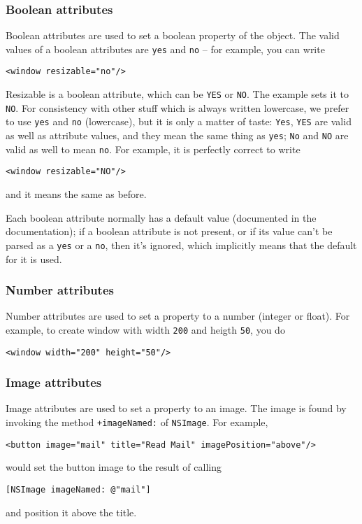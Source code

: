 \subsubsection{Boolean attributes}
Boolean attributes are used to set a boolean property of the object.
The valid values of a boolean attributes are \texttt{yes} and
\texttt{no} -- for example, you can write
\begin{verbatim}
<window resizable="no"/>
\end{verbatim}
Resizable is a boolean attribute, which can be \texttt{YES} or
\texttt{NO}.  The example sets it to \texttt{NO}.  For consistency 
with other stuff which is always written lowercase, we prefer to use
\texttt{yes} and \texttt{no} (lowercase), but it is only a matter of taste: 
\texttt{Yes}, \texttt{YES} are valid as well as attribute values, and they
mean the same thing as \texttt{yes}; \texttt{No} and \texttt{NO} are
valid as well to mean \texttt{no}.  For example, it is perfectly
correct to write
\begin{verbatim}
<window resizable="NO"/>
\end{verbatim}
and it means the same as before.

Each boolean attribute normally has a default value (documented in the
documentation); if a boolean attribute is not present, or if its value
can't be parsed as a \texttt{yes} or a \texttt{no}, then it's ignored,
which implicitly means that the default for it is used.

\subsubsection{Number attributes}
Number attributes are used to set a property to a number (integer or
float).  For example, to create window with width \texttt{200} and 
heigth \texttt{50}, you do
\begin{verbatim}
<window width="200" height="50"/>
\end{verbatim}

\subsubsection{Image attributes}
Image attributes are used to set a property to an image.  The image is
found by invoking the method \texttt{+imageNamed:} of
\texttt{NSImage}.  For example,
\begin{verbatim}
<button image="mail" title="Read Mail" imagePosition="above"/>
\end{verbatim}
would set the button image to the result of calling 
\begin{verbatim}
[NSImage imageNamed: @"mail"]
\end{verbatim}
and position it above the title.

